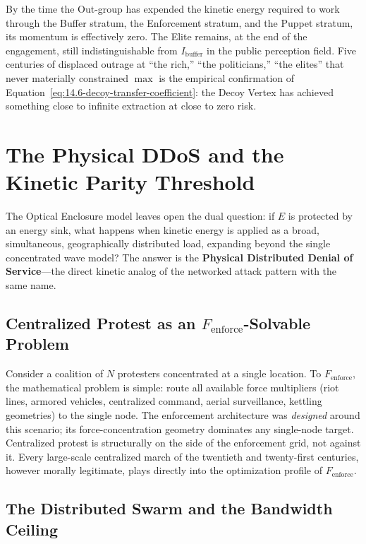 By the time the Out-group has expended the kinetic energy required to work through the Buffer stratum, the Enforcement stratum, and the Puppet stratum, its momentum is effectively zero. The Elite remains, at the end of the engagement, still indistinguishable from $I_{\text{buffer}}$ in the public perception field. Five centuries of displaced outrage at ``the rich,'' ``the politicians,'' ``the elites'' that never materially constrained $\max$ is the empirical confirmation of Equation~\eqref{eq:14.6-decoy-transfer-coefficient}: the Decoy Vertex has achieved something close to infinite extraction at close to zero risk.

\section{The Physical DDoS and the Kinetic Parity Threshold}
\label{sec:physical_ddos}

The Optical Enclosure model leaves open the dual question: if $E$ is protected by an energy sink, what happens when kinetic energy is applied as a broad, simultaneous, geographically distributed load, expanding beyond the single concentrated wave model? The answer is the \textbf{Physical Distributed Denial of Service}---the direct kinetic analog of the networked attack pattern with the same name.

\subsection{Centralized Protest as an $F_{\text{enforce}}$-Solvable Problem}

Consider a coalition of $N$ protesters concentrated at a single location. To $F_{\text{enforce}}$, the mathematical problem is simple: route all available force multipliers (riot lines, armored vehicles, centralized command, aerial surveillance, kettling geometries) to the single node. The enforcement architecture was \textit{designed} around this scenario; its force-concentration geometry dominates any single-node target. Centralized protest is structurally on the side of the enforcement grid, not against it. Every large-scale centralized march of the twentieth and twenty-first centuries, however morally legitimate, plays directly into the optimization profile of $F_{\text{enforce}}$.

\subsection{The Distributed Swarm and the Bandwidth Ceiling}

